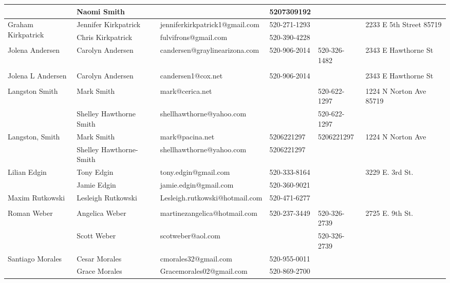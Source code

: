 \documentclass[landscape]{article}\usepackage[]{graphicx}\usepackage[]{color}
\begin{document}
\begin{longtable}{|p{100pt}|p{100pt}|p{140pt}|p{60pt}|p{64pt}|p{120pt}|}
 & Naomi Smith &  & 5207309192 &  & \\
\hline
\multirow{2}{100pt}{Graham Kirkpatrick} & Jennifer Kirkpatrick & jenniferkirkpatrick1@gmail.com & 520-271-1293 &  & \multirow{2}{120pt}{2233 E 5th Street 85719} \\
 & Chris Kirkpatrick & fulvifrons@gmail.com & 520-390-4228 &  & \\
\hline
\multirow{2}{100pt}{Jolena Andersen} & Carolyn Andersen & candersen@graylinearizona.com & 520-906-2014 & 520-326-1482 & \multirow{2}{120pt}{2343 E Hawthorne St} \\
 &  &  &  &  & \\
\hline
\multirow{2}{100pt}{Jolena L Andersen} & Carolyn Andersen & candersen1@cox.net & 520-906-2014 &  & \multirow{2}{120pt}{2343 E Hawthorne St} \\
 &  &  &  &  & \\
\hline
\multirow{2}{100pt}{Langston Smith} & Mark Smith & mark@cerica.net &  & 520-622-1297 & \multirow{2}{120pt}{1224 N Norton Ave 85719} \\
 & Shelley Hawthorne Smith & shellhawthorne@yahoo.com &  & 520-622-1297 & \\
\hline
\multirow{2}{100pt}{Langston, Smith} & Mark Smith & mark@pacina.net & 5206221297 & 5206221297 & \multirow{2}{120pt}{1224 N Norton Ave} \\
 & Shelley Hawthorne-Smith & shellhawthorne@yahoo.com & 5206221297 &  & \\
\hline
\multirow{2}{100pt}{Lilian Edgin} & Tony Edgin & tony.edgin@gmail.com & 520-333-8164 &  & \multirow{2}{120pt}{3229 E. 3rd St.} \\
 & Jamie Edgin & jamie.edgin@gmail.com & 520-360-9021 &  & \\
\hline
\multirow{2}{100pt}{Maxim Rutkowski } & Lesleigh Rutkowski  & Lesleigh.rutkowski@hotmail.com & 520-471-6277 &  & \multirow{2}{120pt}{} \\
 &  &  &  &  & \\
\hline
\multirow{2}{100pt}{Roman Weber} & Angelica Weber & martinezangelica@hotmail.com & 520-237-3449 & 520-326-2739 & \multirow{2}{120pt}{2725 E. 9th St.} \\
 & Scott Weber & scotweber@aol.com &  & 520-326-2739 & \\
\hline
\multirow{2}{100pt}{Santiago Morales } & Cesar Morales & cmorales32@gmail.com & 520-955-0011 &  & \multirow{2}{120pt}{} \\
 & Grace Morales  & Gracemorales02@gmail.com & 520-869-2700 &  & \\

\end{longtable}
\end{document}
